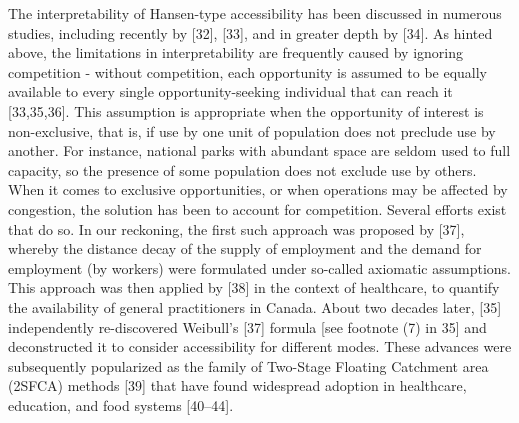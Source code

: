\documentclass[10pt,letterpaper]{article}
\begin{document}
The interpretability of Hansen-type accessibility has been discussed in
numerous studies, including recently by {[}32{]}, {[}33{]}, and in
greater depth by {[}34{]}. As hinted above, the limitations in
interpretability are frequently caused by ignoring competition - without
competition, each opportunity is assumed to be equally available to
every single opportunity-seeking individual that can reach it
{[}33,35,36{]}. This assumption is appropriate when the opportunity of
interest is non-exclusive, that is, if use by one unit of population
does not preclude use by another. For instance, national parks with
abundant space are seldom used to full capacity, so the presence of some
population does not exclude use by others. When it comes to exclusive
opportunities, or when operations may be affected by congestion, the
solution has been to account for competition. Several efforts exist that
do so. In our reckoning, the first such approach was proposed by
{[}37{]}, whereby the distance decay of the supply of employment and the
demand for employment (by workers) were formulated under so-called
axiomatic assumptions. This approach was then applied by {[}38{]} in the
context of healthcare, to quantify the availability of general
practitioners in Canada. About two decades later, {[}35{]} independently
re-discovered Weibull's {[}37{]} formula {[}see footnote (7) in 35{]}
and deconstructed it to consider accessibility for different modes.
These advances were subsequently popularized as the family of Two-Stage
Floating Catchment area (2SFCA) methods {[}39{]} that have found
widespread adoption in healthcare, education, and food systems
{[}40--44{]}.
\end{document}
